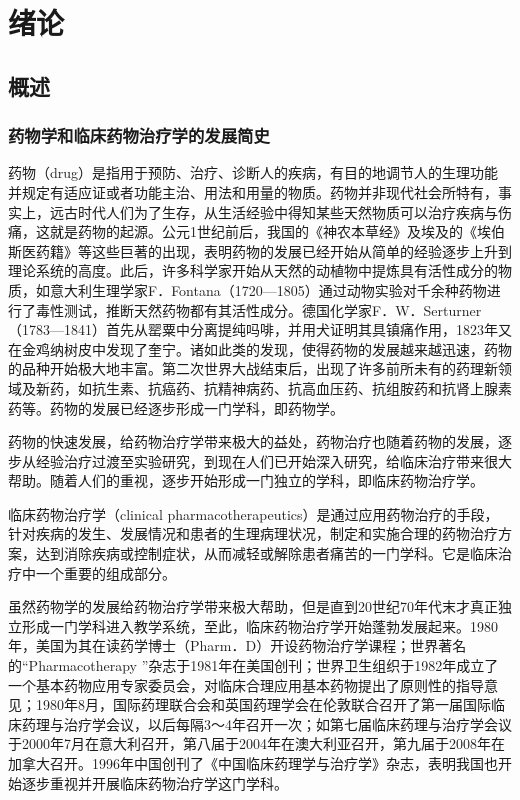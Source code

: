 \chapter{绪论}

\section{概述}

\subsection{药物学和临床药物治疗学的发展简史}

药物（drug）是指用于预防、治疗、诊断人的疾病，有目的地调节人的生理功能并规定有适应证或者功能主治、用法和用量的物质。药物并非现代社会所特有，事实上，远古时代人们为了生存，从生活经验中得知某些天然物质可以治疗疾病与伤痛，这就是药物的起源。公元1世纪前后，我国的《神农本草经》及埃及的《埃伯斯医药籍》等这些巨著的出现，表明药物的发展已经开始从简单的经验逐步上升到理论系统的高度。此后，许多科学家开始从天然的动植物中提炼具有活性成分的物质，如意大利生理学家F．Fontana（1720---1805）通过动物实验对千余种药物进行了毒性测试，推断天然药物都有其活性成分。德国化学家F．W．Serturner（1783---1841）首先从罂粟中分离提纯吗啡，并用犬证明其具镇痛作用，1823年又在金鸡纳树皮中发现了奎宁。诸如此类的发现，使得药物的发展越来越迅速，药物的品种开始极大地丰富。第二次世界大战结束后，出现了许多前所未有的药理新领域及新药，如抗生素、抗癌药、抗精神病药、抗高血压药、抗组胺药和抗肾上腺素药等。药物的发展已经逐步形成一门学科，即药物学。

药物的快速发展，给药物治疗学带来极大的益处，药物治疗也随着药物的发展，逐步从经验治疗过渡至实验研究，到现在人们已开始深入研究，给临床治疗带来很大帮助。随着人们的重视，逐步开始形成一门独立的学科，即临床药物治疗学。

临床药物治疗学（clinical
pharmacotherapeutics）是通过应用药物治疗的手段，针对疾病的发生、发展情况和患者的生理病理状况，制定和实施合理的药物治疗方案，达到消除疾病或控制症状，从而减轻或解除患者痛苦的一门学科。它是临床治疗中一个重要的组成部分。

虽然药物学的发展给药物治疗学带来极大帮助，但是直到20世纪70年代末才真正独立形成一门学科进入教学系统，至此，临床药物治疗学开始蓬勃发展起来。1980年，美国为其在读药学博士（Pharm．D）开设药物治疗学课程；世界著名的``{Pharmacotherapy}
''杂志于1981年在美国创刊；世界卫生组织于1982年成立了一个基本药物应用专家委员会，对临床合理应用基本药物提出了原则性的指导意见；1980年8月，国际药理联合会和英国药理学会在伦敦联合召开了第一届国际临床药理与治疗学会议，以后每隔3～4年召开一次；如第七届临床药理与治疗学会议于2000年7月在意大利召开，第八届于2004年在澳大利亚召开，第九届于2008年在加拿大召开。1996年中国创刊了《中国临床药理学与治疗学》杂志，表明我国也开始逐步重视并开展临床药物治疗学这门学科。

